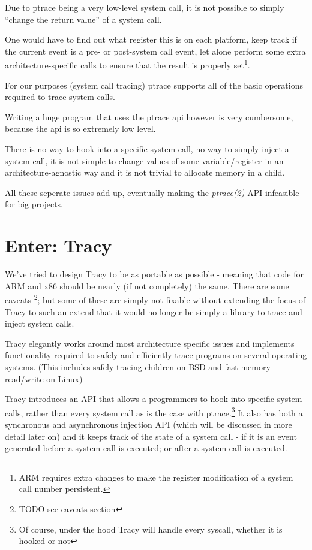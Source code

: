 \documentclass[a4paper, twoside, 10pt, twocolumn]{report}
\begin{document}
Due to ptrace being a very low-level system call,
it is not possible to simply ``change the return value'' of a system call.

One would have to find out what register this is on each platform,
keep track if the current event is a pre- or post-system call event, let alone
perform some extra architecture-specific calls to ensure that the result is
properly set\footnote{ARM requires extra changes to make the register
modification of a system call number persistent.}.

For our purposes (system call tracing) ptrace supports all of the basic
operations required to trace system calls.

Writing a huge program that uses the ptrace api however is very cumbersome,
because the api is so extremely low level.

There is no way to hook into a specific system call, no way
to simply inject a system call, it is not simple to change values of some
variable/register in an architecture-agnostic way and it is not trivial
to allocate memory in a child.

All these seperate issues add up, eventually making the \textit{ptrace(2)} API
infeasible for big projects.

\section{Enter: Tracy}

We've tried to design Tracy to be as portable as possible - meaning that code
for ARM and x86 should be nearly (if not completely) the same. There are some
caveats \footnote{TODO see caveats section}; but some of these are simply not
fixable without extending the focus of Tracy to such an extend that it would no
longer be simply a library to trace and inject system calls.

Tracy elegantly works around most architecture specific issues and implements
functionality required to safely and efficiently trace programs on several
operating systems. (This includes safely tracing children on BSD and fast memory
read/write on Linux)

Tracy introduces an API that allows a programmers to hook into specific system
calls, rather than every system call as is the case with ptrace.\footnote{Of
course, under the hood Tracy will handle every syscall, whether it is hooked
or not}
It also has both a synchronous and asynchronous injection API (which
will be discussed in more detail later on) and it keeps track of the state of a
system call - if it is an event generated before a system call is executed; or
after a system call is executed.
\end{document}
